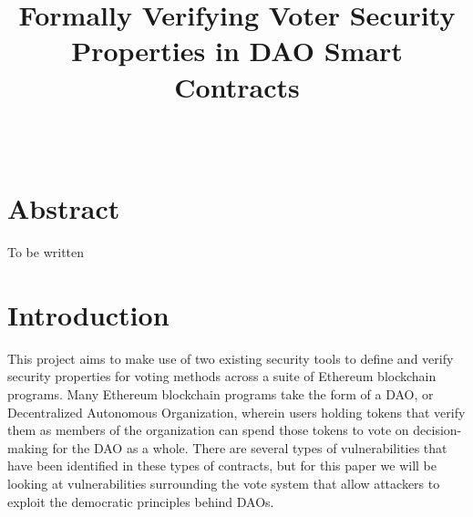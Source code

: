 \documentclass[conference]{IEEEtran}
\begin{document}
\title{Formally Verifying Voter Security Properties in DAO Smart Contracts}

\author{
    \\[1.5em]

}

\maketitle



\section{Abstract}
To be written


\section{Introduction}
This project aims to make use of two existing security tools to define and verify security properties for voting methods across a suite of Ethereum blockchain programs. Many Ethereum blockchain programs take the form of a DAO, or Decentralized Autonomous Organization, wherein users holding tokens that verify them as members of the organization can spend those tokens to vote on decision-making for the DAO as a whole. There are several types of vulnerabilities that have been identified in these types of contracts, but for this paper we will be looking at vulnerabilities surrounding the vote system that allow attackers to exploit the democratic principles behind DAOs.
\end{document}
